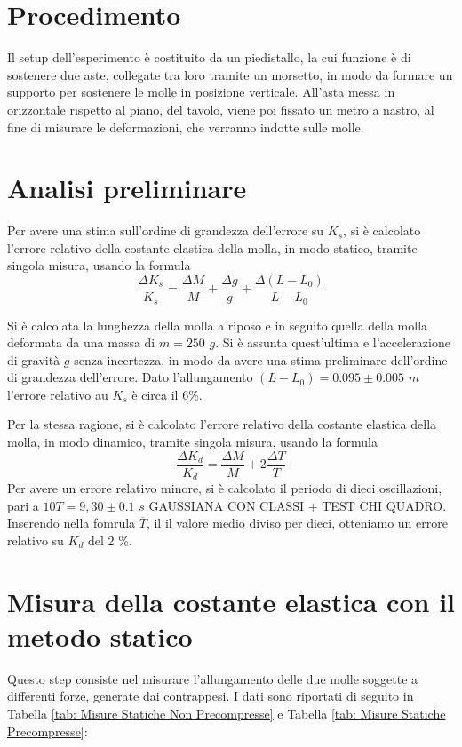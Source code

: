 \documentclass[12pt, a4paper]{article}
\begin{document}
    
\section{Procedimento}
Il setup dell'esperimento è costituito da un piedistallo, la cui funzione è di sostenere due aste, collegate tra loro tramite un morsetto, in modo da formare un supporto per sostenere le molle in posizione verticale.
All'asta messa in orizzontale rispetto al piano, del tavolo, viene poi fissato un metro a nastro, al fine di misurare le deformazioni, che verranno indotte sulle molle. 



\section{Analisi preliminare}
Per avere una stima sull'ordine di grandezza dell'errore su $K_s$, si è calcolato l'errore relativo della costante elastica della molla, in modo statico, tramite singola misura, usando la formula 
\begin{equation*}
    \frac{\Delta K_s}{K_s}=\frac{\Delta M}{M}+\frac{\Delta g}{g}+ \frac{\Delta (L-L_0)}{L-L_0}
\end{equation*}

Si è calcolata la lunghezza della molla a riposo e in seguito quella della molla deformata da una massa di $m=250$ $g$.
Si è assunta quest'ultima e l'accelerazione di gravità $g$ senza incertezza, in modo da avere una stima preliminare dell'ordine di grandezza dell'errore.
Dato l'allungamento $(L-L_0)=0.095\pm 0.005$ $m$ l'errore relativo au $K_s$ è circa il $6$\%.

Per la stessa ragione, si è calcolato l'errore relativo della costante elastica della molla, in modo dinamico, tramite singola misura, usando la formula 
\begin{equation*}
    \frac{\Delta K_d}{K_d}=\frac{\Delta M}{M}+2\frac{\Delta T}{T}
\end{equation*}
Per avere un errore relativo minore, si è calcolato il periodo di dieci oscillazioni, pari a $10T= 9,30 \pm 0.1$ $s$  GAUSSIANA CON CLASSI + TEST CHI QUADRO. Inserendo nella fomrula $\overline T$, il il valore medio diviso per dieci, otteniamo un errore relativo su $K_d$ del 2 \%.



\section{Misura della costante elastica con il metodo statico}
Questo step consiste nel misurare l'allungamento delle due molle soggette a differenti forze, generate dai contrappesi. I dati sono riportati di seguito in Tabella \ref{tab: Misure Statiche Non Precompresse} e Tabella \ref{tab: Misure Statiche Precompresse}:
\\
\end{document}
